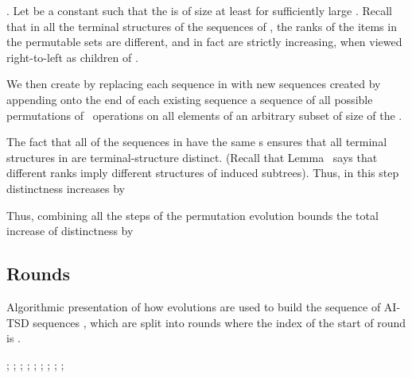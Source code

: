  . Let  be a constant such that the  is of size at least  for sufficiently large . Recall that in all the terminal structures
of the sequences of , the ranks of the items in the permutable sets are different, and in fact are strictly increasing, when viewed right-to-left as children of .


 We then create  by replacing each sequence in  with  new sequences created by appending onto the end of each existing sequence a sequence of all possible permutations of \opDc\ operations on all elements of an arbitrary subset of size  of the .

The fact that all of the sequences in  have the same s ensures that all terminal structures in  are terminal-structure distinct. 
 (Recall that Lemma~ says that different ranks imply different structures of induced subtrees). 
Thus, in this step distinctness increases by  
\begin{fullonly}

Thus, combining all the steps of the permutation evolution bounds the total increase of distinctness by

\end{fullonly}


\subsection{Rounds} 

\begin{fullonly}
\begin{algorithm}
\caption{Algorithmic
 presentation of how evolutions are used to build the sequence of AI-TSD sequences 
 , which are split into rounds where the index of the start of round  is .
} 
\begin{algorithmic}
\State 
\State 
\State 
\State ;
\Loop
\State ; 
\If {} 
\State ; 
\State ; 
\Else 
\State ; 
\EndIf
\State  ; 
\State ;
\EndFor
\State ; 
\State ; 
\EndLoop
\end{algorithmic}

\end{algorithm}
\end{fullonly}



